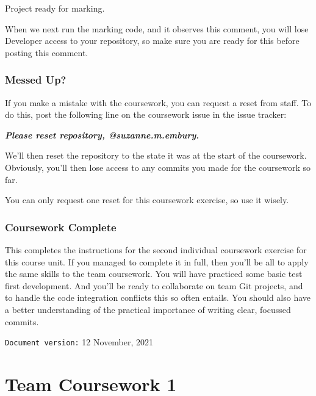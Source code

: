 \documentclass[
]{book}
\newenvironment{Shaded}{\begin{snugshade}}{\end{snugshade}}
\newcommand{\InformationTok}[1]{\textcolor[rgb]{0.56,0.35,0.01}{\textbf{\textit{#1}}}}
\newcommand{\NormalTok}[1]{#1}
\begin{document}
\begin{Shaded}
\begin{Highlighting}[]
\NormalTok{Project ready for marking.}
\end{Highlighting}
\end{Shaded}

When we next run the marking code, and it observes this comment, you will lose Developer access to your repository, so make sure you are ready for this before posting this comment.

\hypertarget{messi}{%
\subsection{Messed Up?}\label{messi}}

If you make a mistake with the coursework, you can request a reset from staff. To do this, post the following line on the coursework issue in the issue tracker:

\begin{Shaded}
\begin{Highlighting}[]
\InformationTok{    Please reset repository, @suzanne.m.embury.}
\end{Highlighting}
\end{Shaded}

We'll then reset the repository to the state it was at the start of the coursework. Obviously, you'll then lose access to any commits you made for the coursework so far.

You can only request one reset for this coursework exercise, so use it wisely.

\hypertarget{cw2fin}{%
\subsection{Coursework Complete}\label{cw2fin}}

This completes the instructions for the second individual coursework exercise for this course unit. If you managed to complete it in full, then you'll be all to apply the same skills to the team coursework. You will have practiced some basic test first development. And you'll be ready to collaborate on team Git projects, and to handle the code integration conflicts this so often entails. You should also have a better understanding of the practical importance of writing clear, focussed commits.

\texttt{Document\ version:} 12 November, 2021

\hypertarget{dealing}{%
\chapter{Team Coursework 1}\label{dealing}}
\end{document}
